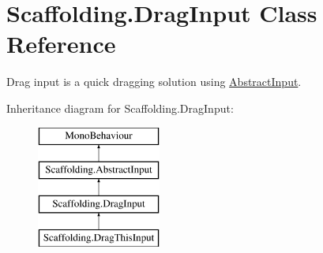 \hypertarget{class_scaffolding_1_1_drag_input}{\section{Scaffolding.\+Drag\+Input Class Reference}
\label{class_scaffolding_1_1_drag_input}
}


Drag input is a quick dragging solution using \hyperlink{class_scaffolding_1_1_abstract_input}{Abstract\+Input}.  


Inheritance diagram for Scaffolding.\+Drag\+Input\+:\begin{figure}[H]
\begin{center}
\leavevmode
\includegraphics[height=4.000000cm]{class_scaffolding_1_1_drag_input}
\end{center}
\end{figure}
